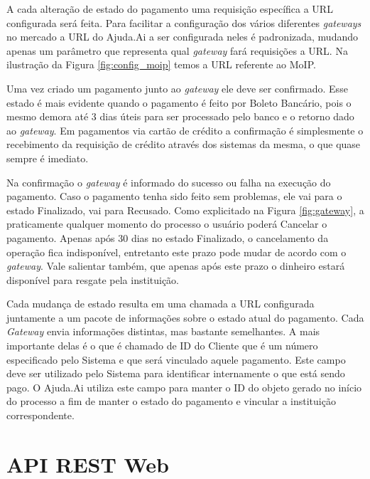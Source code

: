 A cada alteração de estado do pagamento uma requisição específica a URL configurada será feita. Para facilitar a configuração dos vários diferentes \emph{gateways} no mercado a URL do Ajuda.Ai a ser configurada neles é padronizada, mudando apenas um parâmetro que representa qual \emph{gateway} fará requisições a URL. Na ilustração da Figura \ref{fig:config_moip} temos a URL referente ao MoIP.

Uma vez criado um pagamento junto ao \emph{gateway} ele deve ser confirmado. Esse estado é mais evidente quando o pagamento é feito por Boleto Bancário, pois o mesmo demora até 3 dias úteis para ser processado pelo banco e o retorno dado ao \emph{gateway}. Em pagamentos via cartão de crédito a confirmação é simplesmente o recebimento da requisição de crédito através dos sistemas da mesma, o que quase sempre é imediato.

Na confirmação o \emph{gateway} é informado do sucesso ou falha na execução do pagamento. Caso o pagamento tenha sido feito sem problemas, ele vai para o estado Finalizado, vai para Recusado. Como explicitado na Figura \ref{fig:gateway}, a praticamente qualquer momento do processo o usuário poderá Cancelar o pagamento. Apenas após 30 dias no estado Finalizado, o cancelamento da operação fica indisponível, entretanto este prazo pode mudar de acordo com o \emph{gateway}. Vale salientar também, que apenas após este prazo o dinheiro estará disponível para resgate pela instituição.

Cada mudança de estado resulta em uma chamada a URL configurada juntamente a um pacote de informações sobre o estado atual do pagamento. Cada \emph{Gateway} envia informações distintas, mas bastante semelhantes. A mais importante delas é o que é chamado de ID do Cliente que é um número especificado pelo Sistema e que será vinculado aquele pagamento. Este campo deve ser utilizado pelo Sistema para identificar internamente o que está sendo pago. O Ajuda.Ai utiliza este campo para manter o ID do objeto  gerado no início do processo a fim de manter o estado do pagamento e vincular a instituição correspondente.





\section{API REST Web} \label{sec:ajudaai:api}


